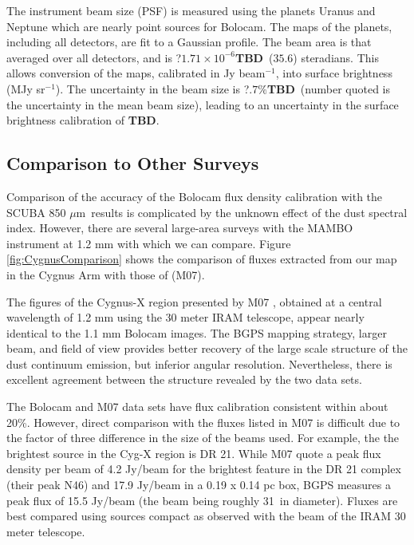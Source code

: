 \documentclass[12pt,preprint]{aastex}
\newcommand{\mum}{\ensuremath{\mu \mathrm{m}}}
\newcommand{\bcamfwhm}{31.2\arcsec}
\newcommand{\TBD}{{\bf TBD}}
\begin{document}
The instrument beam size (PSF) is measured using the planets Uranus
and Neptune which are nearly point sources for Bolocam.
The maps of the planets, including all detectors, are fit to a
Gaussian profile.  The beam area is that averaged over all detectors,
and is ?$1.71\times10^{-6}$\TBD\ ($35.6$\farcs) steradians.  This
allows conversion of the maps, calibrated in Jy beam$^{-1}$, into
surface brightness (MJy sr$^{-1}$).  The uncertainty in the beam size
is ?$.7\%$\TBD\ (number quoted is the uncertainty in the mean beam
size), leading to an uncertainty in the surface brightness calibration
of \TBD.

\subsection{Comparison to Other Surveys}

Comparison of the accuracy of the Bolocam flux density calibration
with the SCUBA 850 \mum\ results is complicated by the unknown effect
of the dust spectral index.  However, there are several large-area
surveys with the MAMBO instrument at 1.2 mm with which we can compare.
Figure \ref{fig:CygnusComparison} shows the comparison of fluxes
extracted from our map in the Cygnus Arm with those of
\citet{motte07} (M07).

The figures of the Cygnus-X region presented by M07
, obtained at a central wavelength of 1.2 mm using the 30 meter IRAM
telescope, appear nearly identical to the 1.1 mm Bolocam images.  The
BGPS mapping strategy, larger beam, and field of view provides better
recovery of the large scale structure of the dust continuum emission,
but inferior angular resolution.  Nevertheless, there is excellent
agreement between the structure revealed by the two data sets.

The Bolocam and M07 data sets have flux calibration consistent within
about 20\%.  However, direct comparison with the fluxes listed in M07
is difficult due to the factor of three difference in the size of the
beams used.  For example, the the brightest source in the Cyg-X region
is DR 21.  While M07 quote a peak flux density per beam of
4.2 Jy/beam for the brightest feature in the DR 21 complex (their peak
N46) and 17.9 Jy/beam in a 0.19 x 0.14 pc box, BGPS measures a peak
flux of 15.5 Jy/beam (the beam being roughly 31\arcsec\ in diameter).
Fluxes are best compared using sources compact as observed with the
beam of the IRAM 30 meter telescope.
\end{document}
